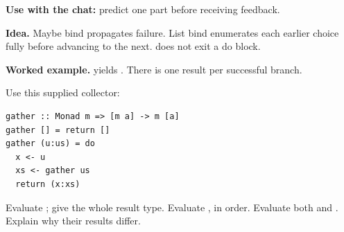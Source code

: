 


\textbf{Use with the chat:} predict one part before receiving feedback.

\textbf{Idea.} Maybe bind propagates failure. List bind enumerates each earlier
choice fully before advancing to the next.  does not exit a do block.

\textbf{Worked example.}  yields
\code{[3,5]}. There is one result per successful branch.

Use this supplied collector:
\par\noindent\begin{minipage}{\linewidth}
\begin{lstlisting}
gather :: Monad m => [m a] -> m [a]
gather [] = return []
gather (u:us) = do
  x <- u
  xs <- gather us
  return (x:xs)
\end{lstlisting}
\end{minipage}\par
{}
Evaluate ; give the whole result type.
Evaluate , in order.
Evaluate both  and .
Explain why their results differ.



